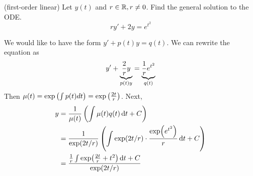 (first-order linear) Let $y(t)$ and $r \in \mathbb{R} , r\neq 0$. Find the general solution to the ODE. 
$$ry' + 2y = e^{t^2}$$ 

\soln* We would like to have the form $y' + p(t)y = q(t)$. We can rewrite the equation as
$$y' + \underbrace{\frac{2}{r}y}_{p(t)y} = \underbrace{\over{r}e^{t^2}}_{q(t)}$$
Then $\mu(t) = \exp \pars{\int p(t) dt} = \exp \pars{\frac{2t}{r}}$. Next,
\begin{align*}
    y&=\over*{\mu(t)} \pars{\displaystyle \int \mu(t)q(t) \dd{t} +C} \\
    &= \over*{\exp(2t/r)} \pars{ \displaystyle \int \exp(2t/r)\cdot\frac{\exp(e^{t^2})}{r} \dd{t} + C }
    \\ &= \frac{ \over{r}\int \exp(\frac{2t}{r}+t^2)\dd{t} + C}{\exp(2t/r)}
\end{align*}


